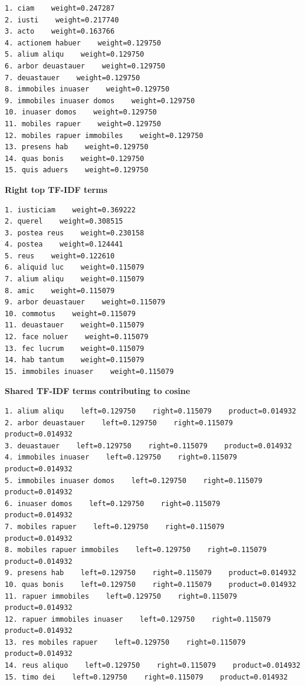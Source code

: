 \begin{lstlisting}[breaklines=true,basicstyle=\ttfamily\small]
1. ciam    weight=0.247287
2. iusti    weight=0.217740
3. acto    weight=0.163766
4. actionem habuer    weight=0.129750
5. alium aliqu    weight=0.129750
6. arbor deuastauer    weight=0.129750
7. deuastauer    weight=0.129750
8. immobiles inuaser    weight=0.129750
9. immobiles inuaser domos    weight=0.129750
10. inuaser domos    weight=0.129750
11. mobiles rapuer    weight=0.129750
12. mobiles rapuer immobiles    weight=0.129750
13. presens hab    weight=0.129750
14. quas bonis    weight=0.129750
15. quis aduers    weight=0.129750
\end{lstlisting}

\textbf{Right top TF-IDF terms} 

\begin{lstlisting}[breaklines=true,basicstyle=\ttfamily\small]
1. iusticiam    weight=0.369222
2. querel    weight=0.308515
3. postea reus    weight=0.230158
4. postea    weight=0.124441
5. reus    weight=0.122610
6. aliquid luc    weight=0.115079
7. alium aliqu    weight=0.115079
8. amic    weight=0.115079
9. arbor deuastauer    weight=0.115079
10. commotus    weight=0.115079
11. deuastauer    weight=0.115079
12. face noluer    weight=0.115079
13. fec lucrum    weight=0.115079
14. hab tantum    weight=0.115079
15. immobiles inuaser    weight=0.115079
\end{lstlisting}

\textbf{Shared TF-IDF terms contributing to cosine} 

\begin{lstlisting}[breaklines=true,basicstyle=\ttfamily\small]
1. alium aliqu    left=0.129750    right=0.115079    product=0.014932
2. arbor deuastauer    left=0.129750    right=0.115079    product=0.014932
3. deuastauer    left=0.129750    right=0.115079    product=0.014932
4. immobiles inuaser    left=0.129750    right=0.115079    product=0.014932
5. immobiles inuaser domos    left=0.129750    right=0.115079    product=0.014932
6. inuaser domos    left=0.129750    right=0.115079    product=0.014932
7. mobiles rapuer    left=0.129750    right=0.115079    product=0.014932
8. mobiles rapuer immobiles    left=0.129750    right=0.115079    product=0.014932
9. presens hab    left=0.129750    right=0.115079    product=0.014932
10. quas bonis    left=0.129750    right=0.115079    product=0.014932
11. rapuer immobiles    left=0.129750    right=0.115079    product=0.014932
12. rapuer immobiles inuaser    left=0.129750    right=0.115079    product=0.014932
13. res mobiles rapuer    left=0.129750    right=0.115079    product=0.014932
14. reus aliquo    left=0.129750    right=0.115079    product=0.014932
15. timo dei    left=0.129750    right=0.115079    product=0.014932
\end{lstlisting}

